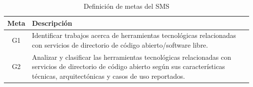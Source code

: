 \begin{table}[H]
	\centering
	\caption{Definición de metas del \acs{SMS}}
	\label{tab:metas}

	\renewcommand{\arraystretch}{1.2}
	\fontsize{9pt}{10pt}\selectfont

	\begin{tabularx}{\textwidth}{|c|X|}
		\hline
		\tableheader
		\textbf{Meta} &
		\textbf{Descripción}
		\\
		\hline
		G1            &
		Identificar trabajos acerca de herramientas tecnológicas relacionadas con servicios de directorio de código abierto/software libre.
		\\
		\hline
		G2            &
		Analizar y clasificar las herramientas tecnológicas relacionadas con servicios de directorio de código abierto según sus características técnicas, arquitectónicas y casos de uso reportados.
		\\
		\hline
	\end{tabularx}
\end{table}
